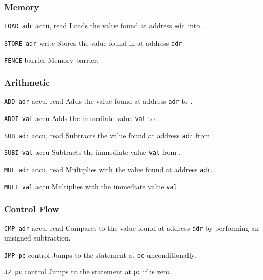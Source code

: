 
\subsubsection{Memory}

{\texttt{LOAD adr}}
{accu, read}
{Loads the value found at address \texttt{adr} into \ACCU.}

{\texttt{STORE adr}}
{write}
{Stores the value found in \ACCU{} at address \texttt{adr}.}

{\texttt{FENCE}}
{barrier}
{Memory barrier.}

\subsubsection{Arithmetic}

{\texttt{ADD adr}}
{accu, read}
{Adds the value found at address \texttt{adr} to \ACCU.}

{\texttt{ADDI val}}
{accu}
{Adds the immediate value \texttt{val} to \ACCU.}

{\texttt{SUB adr}}
{accu, read}
{Subtracts the value found at address \texttt{adr} from \ACCU.}

{\texttt{SUBI val}}
{accu}
{Subtracts the immediate value \texttt{val} from \ACCU.}

{\texttt{MUL adr}}
{accu, read}
{Multiplies \ACCU{} with the value found at address \texttt{adr}.}

{\texttt{MULI val}}
{accu}
{Multiplies \ACCU{} with the immediate value \texttt{val}.}

\subsubsection{Control Flow}

{\texttt{CMP adr}}
{accu, read}
{Compares \ACCU{} to the value found at address \texttt{adr} by performing an unsigned subtraction.}

{\texttt{JMP pc}}
{control}
{Jumps to the statement at \texttt{pc} unconditionally.}

{\texttt{JZ pc}}
{control}
{Jumps to the statement at \texttt{pc} if \ACCU{} is zero.}

